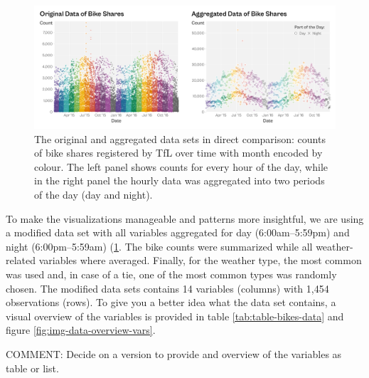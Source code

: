 \documentclass[
]{krantz}
\begin{document}
\begin{figure}
\centering
\includegraphics{./img/setup-data-comparison-raw-aggregated.png}
\caption{\label{fig:img-data-comparison}The original and aggregated data sets in direct comparison: counts of bike shares registered by TfL over time with month encoded by colour. The left panel shows counts for every hour of the day, while in the right panel the hourly data was aggregated into two periods of the day (day and night).}
\end{figure}

To make the visualizations manageable and patterns more insightful, we are using a modified data set with all variables aggregated for day (6:00am--5:59pm) and night (6:00pm--5:59am) (\ref{fig:img-data-comparison}. The bike counts were summarized while all weather-related variables where averaged. Finally, for the weather type, the most common was used and, in case of a tie, one of the most common types was randomly chosen. The modified data sets contains 14 variables (columns) with 1,454 observations (rows). To give you a better idea what the data set contains, a visual overview of the variables is provided in table \ref{tab:table-bikes-data} and figure \ref{fig:img-data-overview-vars}.

COMMENT: Decide on a version to provide and overview of the variables as table or list.
\end{document}
